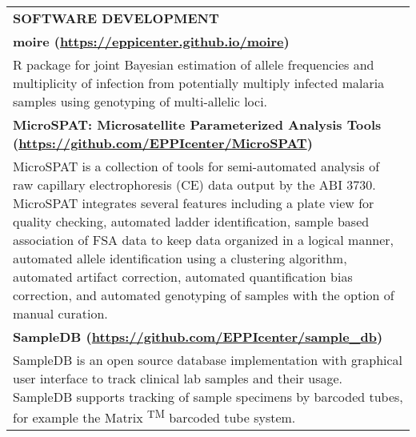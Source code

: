 \begin{center}
    \begin{tabularx}{\textwidth}{X}
        {\large \textbf{SOFTWARE DEVELOPMENT}} \\
        \small \textbf{moire (\href{https://eppicenter.github.io/moire/}{https://eppicenter.github.io/moire})} \\
        \small R package for joint Bayesian estimation of allele frequencies and multiplicity of infection from potentially multiply infected malaria samples using genotyping of multi-allelic loci. \\
        \small \textbf{MicroSPAT: Microsatellite Parameterized Analysis Tools (\href{https://github.com/EPPIcenter/MicroSPAT}{https://github.com/EPPIcenter/MicroSPAT})} \\
        \small MicroSPAT is a collection of tools for semi-automated analysis of raw capillary electrophoresis (CE) data output by the ABI 3730. MicroSPAT integrates several features including a plate view for quality checking, automated ladder identification, sample based association of FSA data to keep data organized in a logical manner, automated allele identification using a clustering algorithm, automated artifact correction, automated quantification bias correction, and automated genotyping of samples with the option of manual curation. \\
        \small \textbf{SampleDB (\href{https://github.com/EPPIcenter/sample_db}{https://github.com/EPPIcenter/sample\_db})} \\
        \small SampleDB is an open source database implementation with graphical user interface to track clinical lab samples and their usage. SampleDB supports tracking of sample specimens by barcoded tubes, for example the Matrix \textsuperscript{TM} barcoded tube system. \\
    \end{tabularx}
\end{center}
